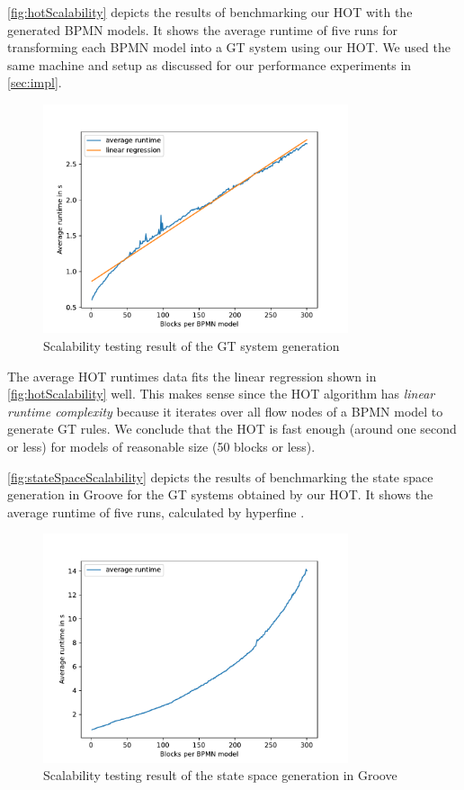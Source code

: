 \documentclass{lmcs} %
\begin{document}
\autoref{fig:hotScalability} depicts the results of benchmarking our HOT with the generated BPMN models.
It shows the average runtime of five runs for transforming each BPMN model into a GT system using our HOT.
We used the same machine and setup as discussed for our performance experiments in \autoref{sec:impl}.

\begin{figure}[ht]
    \centering
    \includegraphics[width=0.8\textwidth]{images/HOT_scalability.pdf}
    \caption{Scalability testing result of the GT system generation}
    \label{fig:hotScalability}
\end{figure}

The average HOT runtimes data fits the linear regression shown in \autoref{fig:hotScalability} well.
This makes sense since the HOT algorithm has \textit{linear runtime complexity} because it iterates over all flow nodes of a BPMN model to generate GT rules.
We conclude that the HOT is fast enough (around one second or less) for models of reasonable size (50 blocks or less).

\autoref{fig:stateSpaceScalability} depicts the results of benchmarking the state space generation in Groove for the GT systems obtained by our HOT.
It shows the average runtime of five runs, calculated by hyperfine \cite{peterHyperfine2023}.

\begin{figure}[ht]
    \centering
    \includegraphics[width=0.8\textwidth]{images/StateSpaceGeneration_scalability.pdf}
    \caption{Scalability testing result of the state space generation in Groove}
    \label{fig:stateSpaceScalability}
\end{figure}
\end{document}
